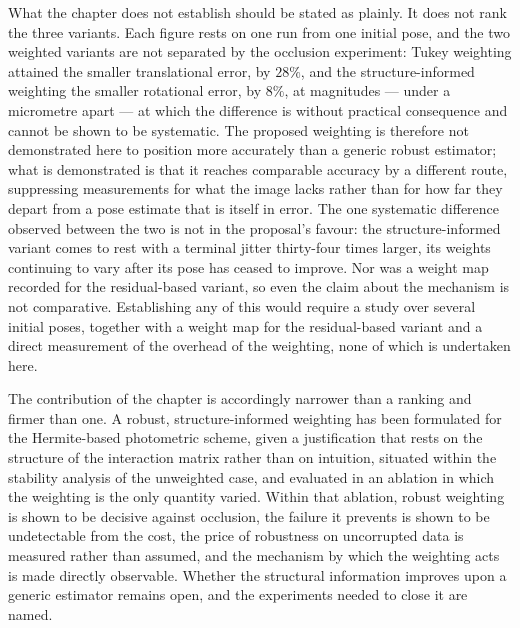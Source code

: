 What the chapter does not establish should be stated as plainly. It does not
rank the three variants. Each figure rests on one run from one initial pose,
and the two weighted variants are not separated by the occlusion experiment:
Tukey weighting attained the smaller translational error, by $28\%$, and the
structure-informed weighting the smaller rotational error, by $8\%$, at
magnitudes --- under a micrometre apart --- at which the difference is without
practical consequence and cannot be shown to be systematic. The proposed
weighting is therefore not demonstrated here to position more accurately than
a generic robust estimator; what is demonstrated is that it reaches comparable
accuracy by a different route, suppressing measurements for what the image
lacks rather than for how far they depart from a pose estimate that is itself
in error. The one systematic difference observed between the two is not in the
proposal's favour: the structure-informed variant comes to rest with a
terminal jitter thirty-four times larger, its weights continuing to vary after
its pose has ceased to improve. Nor was a weight map recorded for the
residual-based variant, so even the claim about the mechanism is not
comparative. Establishing any of this would require a study over several
initial poses, together with a weight map for the residual-based variant and a
direct measurement of the overhead of the weighting, none of which is
undertaken here.

The contribution of the chapter is accordingly narrower than a ranking and
firmer than one. A robust, structure-informed weighting has been formulated
for the Hermite-based photometric scheme, given a justification that rests on
the structure of the interaction matrix rather than on intuition, situated
within the stability analysis of the unweighted case, and evaluated in an
ablation in which the weighting is the only quantity varied. Within that
ablation, robust weighting is shown to be decisive against occlusion, the
failure it prevents is shown to be undetectable from the cost, the price of
robustness on uncorrupted data is measured rather than assumed, and the
mechanism by which the weighting acts is made directly observable. Whether the
structural information improves upon a generic estimator remains open, and the
experiments needed to close it are named.


